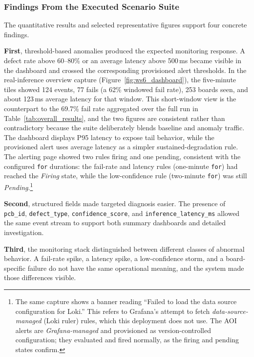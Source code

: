 \documentclass[12pt,a4paper]{article}
\begin{document}
\subsubsection{Findings From the Executed Scenario Suite}
The quantitative results and selected representative figures support four
concrete findings.

\textbf{First}, threshold-based anomalies produced the expected monitoring
response. A defect rate above 60--80\% or an average latency above 500\,ms
became visible in the dashboard and crossed the corresponding provisioned alert
thresholds. In the real-inference overview capture (Figure~\ref{fig:ws6_dashboard}), the
five-minute tiles showed 124 events, 77 fails (a 62\% windowed fail rate), 253
boards seen, and about 123\,ms average latency for that window. This short-window
view is the counterpart to the 69.7\% fail rate aggregated over the full run in
Table~\ref{tab:overall_results}, and the two figures are consistent rather than
contradictory because the suite deliberately blends baseline and anomaly traffic.
The dashboard displays P95 latency to expose tail behavior, while the
provisioned alert uses average latency as a simpler sustained-degradation rule.
The alerting page showed two rules firing and one pending, consistent with the
configured \texttt{for} durations: the fail-rate and latency rules (one-minute
\texttt{for}) had reached the \emph{Firing} state, while the low-confidence rule
(two-minute \texttt{for}) was still \emph{Pending}.\footnote{The same capture
shows a banner reading ``Failed to load the data source configuration for
Loki.'' This refers to Grafana's attempt to fetch \emph{data-source-managed}
(Loki ruler) rules, which this deployment does not use. The AOI alerts are
\emph{Grafana-managed} and provisioned as version-controlled configuration; they
evaluated and fired normally, as the firing and pending states confirm.}

\textbf{Second}, structured fields made targeted diagnosis easier. The
presence of \texttt{pcb\_id}, \texttt{defect\_type}, \texttt{confidence\_score},
and \texttt{inference\_latency\_ms} allowed the same event stream to support
both summary dashboards and detailed investigation.

\textbf{Third}, the monitoring stack distinguished between
different classes of abnormal behavior. A fail-rate spike, a latency spike, a
low-confidence storm, and a board-specific failure do not have the same
operational meaning, and the system made those differences visible.
\end{document}
